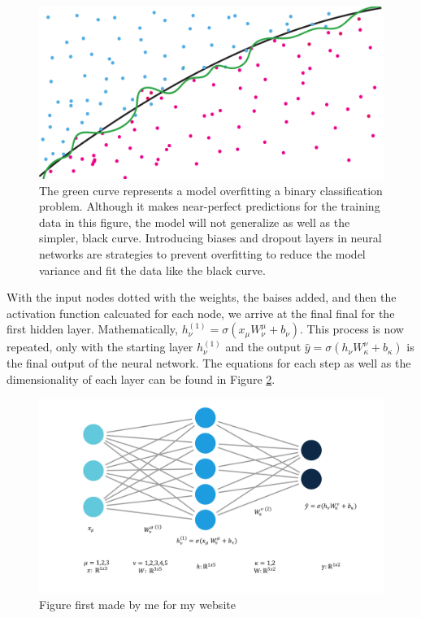 \begin{figure}[h]
    \centering
    \includegraphics[width=\linewidth]{Chapters/Figures/overfittingOrig2.pdf}
    \caption[Overfitting]{The green curve represents a model overfitting a binary classification problem. Although it makes near-perfect predictions for the training data in this figure, the model will not generalize as well as the simpler, black curve. Introducing biases and dropout layers in neural networks are strategies to prevent overfitting to reduce the model variance and fit the data like the black curve.}
    \label{fig:overfitting}
\end{figure}


With the input nodes dotted with the weights, the baises added, and then the activation function calcuated for each node, we arrive at the final final for the first hidden layer. Mathematically, $ h_\nu^{(1)} = \sigma\left( x_\mu W_\nu ^\mu + b_\nu \right) $. This process is now repeated, only with the starting layer $ h_\nu^{(1)} $ and the output
$ \hat{y} = \sigma \left( h_\nu W_\kappa ^\nu + b_\kappa \right)$ is the final output of the neural network. The equations for each step as well as the dimensionality of each layer can be found in Figure \ref{fig:simpleNN}.

\begin{figure}[h!]
    \centering
    \includegraphics[width=\linewidth]{Chapters/Figures/einstein_NN.pdf}
    \caption[Neural Network Example]{Figure first made by me for my website}
    \label{fig:simpleNN}
\end{figure}

